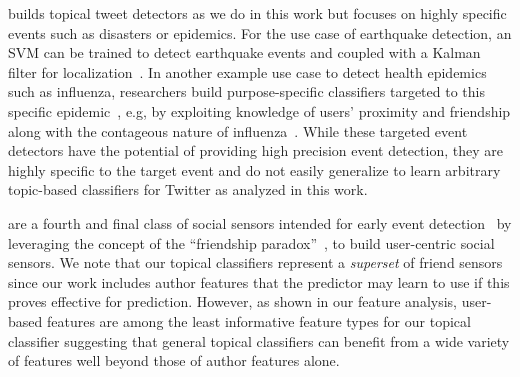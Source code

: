 \vspace{2mm}
 builds topical tweet detectors 
as we do in this work but focuses on highly specific events 
such as disasters or epidemics.  For the use case of earthquake
detection, an SVM can be trained to detect earthquake events
and coupled with a Kalman filter for localization~\cite{sakakiEq2}.
%
%
%
In another example use case to detect health epidemics such as
influenza, researchers build purpose-specific classifiers targeted to
this specific epidemic~\cite{culotta,aramaki}, e.g, by exploiting
knowledge of users' proximity and friendship along with the contageous
nature of influenza~\cite{sadilek}.  While these targeted event
detectors have the potential of providing high precision event
detection, they are highly specific to the target event and do not
easily generalize to learn arbitrary topic-based classifiers
for Twitter as analyzed in this work.

\vspace{2mm}
are a fourth and final class of social sensors intended for early
event detection~\cite{sandy,garcia} by leveraging the concept of the
``friendship paradox''~\cite{feld}, %
to build user-centric social sensors.  We note that our topical classifiers 
represent a \emph{superset} of friend sensors since our work
includes author features that the predictor may learn to use if this
proves effective for prediction.  However, as shown in our feature
analysis, user-based features are among the least informative feature
types for our topical classifier suggesting that general topical 
classifiers can benefit from a wide variety of features well beyond those of
author features alone.





